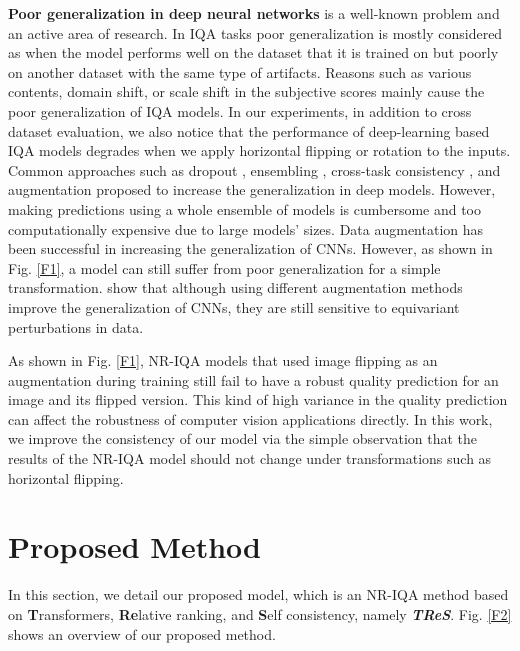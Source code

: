 \documentclass[10pt,twocolumn,letterpaper]{article}
\begin{document}
 
\textbf{Poor generalization in deep neural
networks} is a well-known problem and an active area of research. 
In IQA tasks poor generalization is mostly considered as when  the model performs well on the  dataset that it is trained on but poorly on another dataset with the same type of artifacts.
Reasons such as various contents, domain shift, or scale shift in the subjective scores mainly cause the poor generalization of IQA models.
In our experiments, in addition to cross dataset evaluation, we also notice that the performance of  deep-learning based IQA models degrades when we  apply horizontal flipping or rotation to the inputs.
Common approaches such
as dropout \cite{srivastava2014dropout}, ensembling \cite{zhou2012ensemble}, cross-task consistency \cite{zamir2020robust}, and augmentation proposed to increase the generalization
in deep models. 
However,  making predictions using a whole
ensemble of models is cumbersome and   too computationally expensive  due to large models' sizes.
Data augmentation has been successful in increasing the
generalization of CNNs. 
However, as shown in Fig. \ref{F1}, a model can still suffer from poor
generalization for a simple transformation. 
\cite{worrall2017harmonic, cohen2016group} show that although using different augmentation methods improve the generalization of CNNs, they are still
sensitive to equivariant perturbations in data. 


As shown in Fig. \ref{F1},   NR-IQA models that used
image flipping as an augmentation during training still fail to have a robust quality prediction for
an image and its flipped version. This kind of high variance in the quality prediction can affect the robustness of computer vision applications directly.
In this work, we improve the consistency of our model via the simple observation that the results of the NR-IQA model should not change under transformations such as horizontal flipping.

\vspace{-0.22 cm}
\section{Proposed Method}
In this section, we detail our proposed model, which is an NR-IQA method based on \textbf{T}ransformers, \textbf{Re}lative ranking, and \textbf{S}elf consistency, namely \textit{\textbf{TReS}}.
Fig. \ref{F2} shows an overview of our proposed method.
\end{document}
